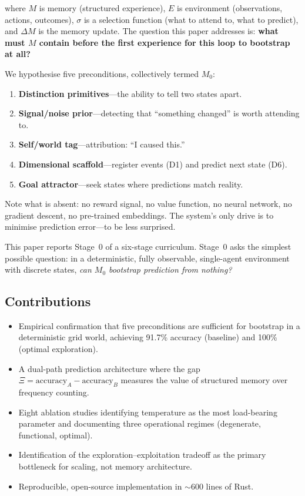 \documentclass[11pt,a4paper]{article}
\begin{document}
\noindent where $M$ is memory (structured experience), $E$ is environment (observations, actions, outcomes), $\sigma$ is a selection function (what to attend to, what to predict), and $\Delta M$ is the memory update. The question this paper addresses is: \textbf{what must $M$ contain before the first experience for this loop to bootstrap at all?}

We hypothesise five preconditions, collectively termed $M_0$:

\begin{enumerate}[nosep]
    \item \textbf{Distinction primitives}---the ability to tell two states apart.
    \item \textbf{Signal/noise prior}---detecting that ``something changed'' is worth attending to.
    \item \textbf{Self/world tag}---attribution: ``I caused this.''
    \item \textbf{Dimensional scaffold}---register events (D1) and predict next state (D6).
    \item \textbf{Goal attractor}---seek states where predictions match reality.
\end{enumerate}

\noindent Note what is absent: no reward signal, no value function, no neural network, no gradient descent, no pre-trained embeddings. The system's only drive is to minimise prediction error---to be less surprised.

This paper reports Stage~0 of a six-stage curriculum. Stage~0 asks the simplest possible question: in a deterministic, fully observable, single-agent environment with discrete states, \textit{can $M_0$ bootstrap prediction from nothing?}

\subsection{Contributions}

\begin{itemize}[nosep]
    \item Empirical confirmation that five preconditions are sufficient for bootstrap in a deterministic grid world, achieving 91.7\% accuracy (baseline) and 100\% (optimal exploration).
    \item A dual-path prediction architecture where the gap $\Xi = \text{accuracy}_A - \text{accuracy}_B$ measures the value of structured memory over frequency counting.
    \item Eight ablation studies identifying temperature as the most load-bearing parameter and documenting three operational regimes (degenerate, functional, optimal).
    \item Identification of the exploration--exploitation tradeoff as the primary bottleneck for scaling, not memory architecture.
    \item Reproducible, open-source implementation in ${\sim}600$ lines of Rust.
\end{itemize}
\end{document}
